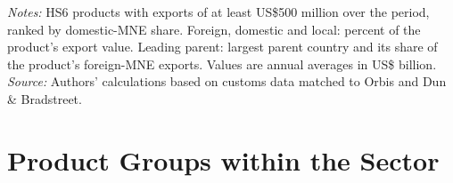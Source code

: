 \documentclass[11pt,a4paper]{article}
\begin{document}
\begin{table}[H]\centering\footnotesize%
  \caption{Agriculture: Products with the Highest Domestic-Multinational Share}%
  \label{tab:hs_by_domestic_share_agro}%
  \par\vspace{3pt}%
  \begin{minipage}{0.95\textwidth}\footnotesize %
  \textit{Notes:} HS6 products with exports of at least US\$500 million over the period, ranked by domestic-MNE share. Foreign, domestic and local: percent of the product's export value. Leading parent: largest parent country and its share of the product's foreign-MNE exports. Values are annual averages in US\$ billion.\\[3pt]%
  \textit{Source:} Authors' calculations based on customs data matched to Orbis and Dun \& Bradstreet.%
  \end{minipage}%
  \end{table}

\section{Product Groups within the Sector}\label{sec:sub_agro}
\end{document}
